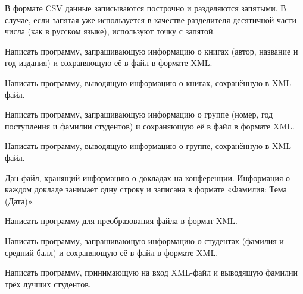 В формате CSV данные записываются построчно и разделяются запятыми. В
случае, если запятая уже используется в качестве разделителя десятичной
части числа (как в русском языке), используют точку с запятой.

\task Написать программу, запрашивающую информацию о книгах (автор,
название и год издания) и сохраняющую её в файл в формате
XML.

Написать программу, выводящую информацию о книгах, сохранённую в
XML-файл.

\task Написать программу, запрашивающую информацию о группе (номер,
год поступления и фамилии студентов) и сохраняющую её в файл в формате
XML.

Написать программу, выводящую информацию о группе, сохранённую в
XML-файл.

\task Дан файл, хранящий информацию о докладах на
конференции. Информация о каждом докладе занимает одну строку и
записана в формате «Фамилия: Тема (Дата)».

Написать программу для преобразования файла в формат XML.

\task Написать программу, запрашивающую информацию о студентах
(фамилия и средний балл) и сохраняющую её в файл в формате XML.

Написать программу, принимающую на вход XML-файл и выводящую фамилии
трёх лучших студентов.
